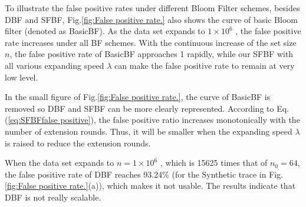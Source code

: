 \documentclass[10pt,journal,compsoc]{IEEEtran}
\newcommand{\rev}[1]{#1}
\newcommand{\DataSetSize}{$1 \times 10^6$ }
\begin{document}
To illustrate the false positive rates under different Bloom Filter schemes, besides DBF and SFBF, Fig.\ref{fig:False positive rate.} also shows the curve of basic Bloom filter (denoted as BasicBF). As the data set expands to \DataSetSize, the false positive rate increases under all BF schemes. With the continuous increase of the set size $n$, the false positive rate of BasicBF approaches 1 rapidly, while our SFBF with all various expanding speed $\lambda$ can \rev{make} the false positive rate to remain at very low level.

In the small figure of Fig.\ref{fig:False positive rate.}, the curve of BasicBF is removed so DBF and SFBF can be more clearly represented. According to Eq.(\ref{eq:SFBFfalse positive}), the false positive ratio increases monotonically with the number of extension rounds. Thus, it will be smaller when the expanding speed $\lambda$ is raised to reduce the extension rounds.




When the data set expands to $n = $\DataSetSize, which is 15625 times that of $n_0= 64$, the false positive rate of DBF reaches 93.24\% (for the Synthetic trace in Fig.\ref{fig:False positive rate.}(a)),
   which makes it not usable. The results indicate that DBF is not really scalable.
\end{document}
